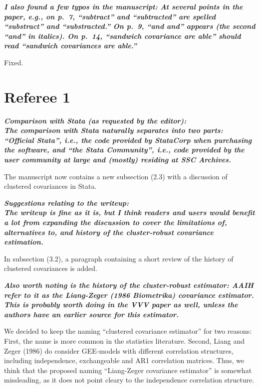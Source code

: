 \documentclass[10pt,a4paper]{article}
\begin{document}
\medskip

\textbf{\textit{I also found a few typos in the manuscript: At several points in the paper,
e.g., on p.~7, ``subtract'' and ``subtracted'' are spelled ``substract'' and
``substracted.'' On p.~9, ``and and'' appears (the second ``and'' in italics). 
On p.~14, ``sandwich covariance are able'' should read ``sandwich covariances
are able.''}}

\medskip

Fixed.

\section*{Referee 1}

\textbf{\textit{Comparison with Stata (as requested by the editor):
\\
The comparison with Stata naturally separates into two parts: ``Official Stata'', i.e., the code provided by StataCorp when purchasing the software, and ``the Stata Community'', i.e., code provided by the user community at large and (mostly) residing at SSC Archives.}}

\medskip

 The manuscript now contains a new subsection (2.3) with a discussion of clustered covariances in Stata.

\medskip

\textbf{\textit{Suggestions relating to the writeup:
\\
The writeup is fine as it is, but I think readers and users would benefit a lot from expanding the discussion to cover the limitations of, alternatives to, and history of the cluster-robust covariance estimation.
}}

\medskip

In subsection (3.2), a paragraph containing a short review of the history of clustered covariances is added.

\medskip

\textbf{\textit{
Also worth noting is the history of the cluster-robust estimator: AAIH refer to it as the Liang-Zeger (1986 Biometrika) covariance estimator.  This is probably worth doing in the VVV paper as well, unless the authors have an earlier source for this estimator.
}}

\medskip

We decided to keep the naming ``clustered covariance estimator'' for two reasons:
First, the name is more common in the statistics literature.
Second, Liang and Zeger (1986) do consider GEE-models with different correlation structures, including independence, exchangeable and AR1 correlation matrices.
Thus, we think that the proposed naming ``Liang-Zeger covariance estimator'' is somewhat missleading, as it does not point cleary to the independence correlation structure.
\end{document}
